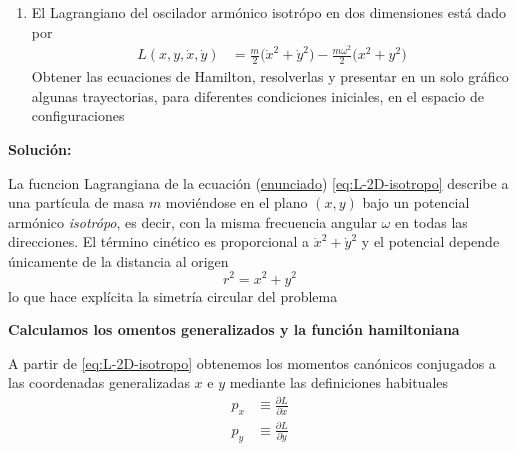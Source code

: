 \documentclass{article}
\newenvironment{AGbox}[1][7]%
{%
  \begin{tcolorbox}[
    enhanced, breakable,
    colframe=AppleGreen,
    colback=AppleGreen!#1,
    boxrule=1pt,
    borderline west={2mm}{-10mm}{AppleGreen},
    sharp corners=southwest,
    left=14pt,right=14pt,top=10pt,bottom=10pt,
     boxsep=6pt,
  ]%
}{%
  \end{tcolorbox}%
}
\begin{document}
\begin{AGbox}[8]
\begin{enumerate}[label={{\textcolor{trueblue}{\textbf{Pr.} 4.4}}}]
  \item El Lagrangiano del oscilador armónico isotrópo en dos dimensiones está dado por
  \begin{equation}
  \begin{split}
  L(x,y,\dot{x},\dot{y})
  &= \frac{m}{2}\bigl(\dot{x}^{2} + \dot{y}^{2}\bigr)
     - \frac{m\omega^{2}}{2}\bigl(x^{2} + y^{2}\bigr)
  \end{split}
  \label{eq:L-2D-isotropo}
  \end{equation}
  Obtener las ecuaciones de Hamilton, resolverlas y presentar en un solo gráfico
  algunas trayectorias, para diferentes condiciones iniciales, en el espacio de
  configuraciones
\end{enumerate}
\end{AGbox}
\vspace{0.5cm}

\textcolor{Cinnabar}{\textbf{Solución:}} \vspace{0.4cm}

La fucncion Lagrangiana de la ecuación (\underline{enunciado}) \eqref{eq:L-2D-isotropo} describe a una partícula de masa $m$
moviéndose en el plano $(x,y)$ bajo un potencial armónico \emph{isotrópo}, es
decir, con la misma frecuencia angular $\omega$ en todas las direcciones.
El término cinético es proporcional a $\dot{x}^{2}+\dot{y}^{2}$ y el potencial
depende únicamente de la distancia al origen
\begin{equation}
r^{2} = x^{2} + y^{2}
\label{eq:r-cuadrado}
\end{equation}
lo que hace explícita la simetría circular del problema

\textcolor{trueblue}{\textbf{Calculamos los omentos generalizados y la función hamiltoniana}}

A partir de \eqref{eq:L-2D-isotropo} obtenemos los momentos canónicos conjugados
a las coordenadas generalizadas $x$ e $y$ mediante las definiciones habituales
\begin{equation}
\begin{split}
p_{x} &\equiv \frac{\partial L}{\partial \dot{x}} \\[4pt]
p_{y} &\equiv \frac{\partial L}{\partial \dot{y}}
\end{split}
\label{eq:def-momenta-2D}
\end{equation}
\end{document}
